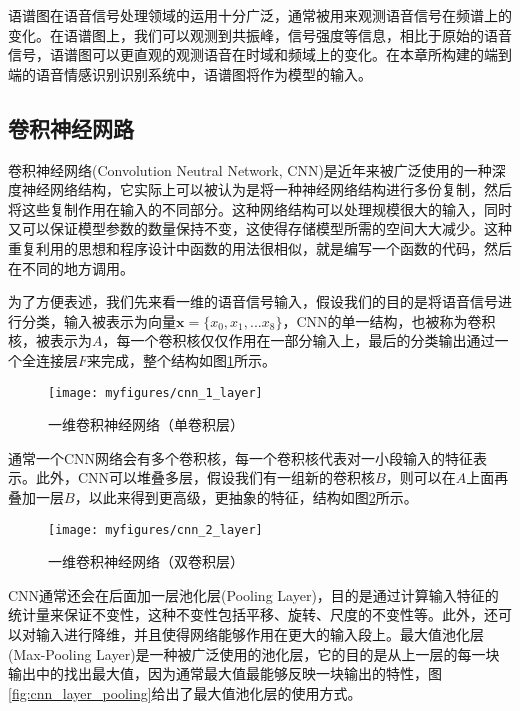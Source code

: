 语谱图在语音信号处理领域的运用十分广泛，通常被用来观测语音信号在频谱上的变化。在语谱图上，我们可以观测到共振峰，信号强度等信息，相比于原始的语音信号，语谱图可以更直观的观测语音在时域和频域上的变化。在本章所构建的端到端的语音情感识别识别系统中，语谱图将作为模型的输入。

\subsection{卷积神经网路}
\label{ssec:cnn}

卷积神经网络(Convolution Neutral Network, CNN)是近年来被广泛使用的一种深度神经网络结构，它实际上可以被认为是将一种神经网络结构进行多份复制，然后将这些复制作用在输入的不同部分。这种网络结构可以处理规模很大的输入，同时又可以保证模型参数的数量保持不变，这使得存储模型所需的空间大大减少。这种重复利用的思想和程序设计中函数的用法很相似，就是编写一个函数的代码，然后在不同的地方调用。

为了方便表述，我们先来看一维的语音信号输入，假设我们的目的是将语音信号进行分类，输入被表示为向量$\mathbf{x}=\{x_0,x_1,...x_8\}$，CNN的单一结构，也被称为卷积核，被表示为$A$，每一个卷积核仅仅作用在一部分输入上，最后的分类输出通过一个全连接层$F$来完成，整个结构如图\ref{fig:cnn_1_layer}所示。

\begin{figure}[htb] %
    \vspace{-0.5cm}  %
    \setlength{\belowcaptionskip}{0cm}   %
    \centering
    \texttt{[image: myfigures/cnn\_1\_layer]}
    \caption{一维卷积神经网络（单卷积层）}
    \label{fig:cnn_1_layer}
\end{figure}

通常一个CNN网络会有多个卷积核，每一个卷积核代表对一小段输入的特征表示。此外，CNN可以堆叠多层，假设我们有一组新的卷积核$B$，则可以在$A$上面再叠加一层$B$，以此来得到更高级，更抽象的特征，结构如图\ref{fig:cnn_2_layer}所示。

\begin{figure}[htb] %
    \vspace{-0.5cm}  %
    \setlength{\belowcaptionskip}{0cm}   %
    \centering
    \texttt{[image: myfigures/cnn\_2\_layer]}
    \caption{一维卷积神经网络（双卷积层）}
    \label{fig:cnn_2_layer}
\end{figure}

CNN通常还会在后面加一层池化层(Pooling Layer)，目的是通过计算输入特征的统计量来保证不变性，这种不变性包括平移、旋转、尺度的不变性等。此外，还可以对输入进行降维，并且使得网络能够作用在更大的输入段上。最大值池化层(Max-Pooling Layer)是一种被广泛使用的池化层，它的目的是从上一层的每一块输出中的找出最大值，因为通常最大值最能够反映一块输出的特性，图\ref{fig:cnn_layer_pooling}给出了最大值池化层的使用方式。

